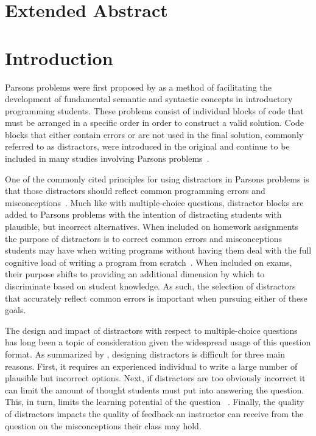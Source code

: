 \documentclass[]{acmart}
\begin{document}
\section{Extended Abstract}




\section{Introduction}

Parsons problems were first proposed by \citet{parsons2006parson} as a method
of facilitating the development of fundamental semantic and syntactic concepts
in introductory programming students. These problems consist of individual
blocks of code that must be arranged in a specific order in order to construct
a valid solution. Code blocks that either contain errors or are not used in the
final solution, commonly referred to as distractors, were introduced in the
original and continue to be included in many studies involving Parsons
problems~\cite{du2020review}.  

One of the commonly cited principles for using distractors in Parsons problems
is that those distractors should reflect common programming errors and
misconceptions~\cite{du2020review, parsons2006parson}.  Much like with
multiple-choice questions, distractor blocks are added to Parsons problems with
the intention of distracting students with plausible, but incorrect
alternatives.  When included on homework assignments the purpose of distractors
is to correct common errors and misconceptions students may have when writing
programs without having them deal with the full cognitive load of writing a
program from scratch~\cite{ericson2017solving, haynes2021problem}.  When
included on exams, their purpose shifts to providing an additional dimension by
which to discriminate based on student knowledge. As such, the selection of
distractors that accurately reflect common errors is important when pursuing
either of these goals. 

The design and impact of distractors with respect to multiple-choice questions
has long been a topic of consideration given the widespread usage of this
question format.  As summarized by \citet{gierl2017developing}, designing
distractors is difficult for three main reasons. First, it requires an
experienced individual to write a large number of plausible but incorrect
options.  Next, if distractors are too obviously incorrect it can limit the
amount of thought students must put into answering the question. This, in turn,
limits the learning potential of the question ~\cite{little2015optimizing}.
Finally, the quality of distractors impacts the quality of feedback an
instructor can receive from the question on the misconceptions their class may
hold.
\end{document}
